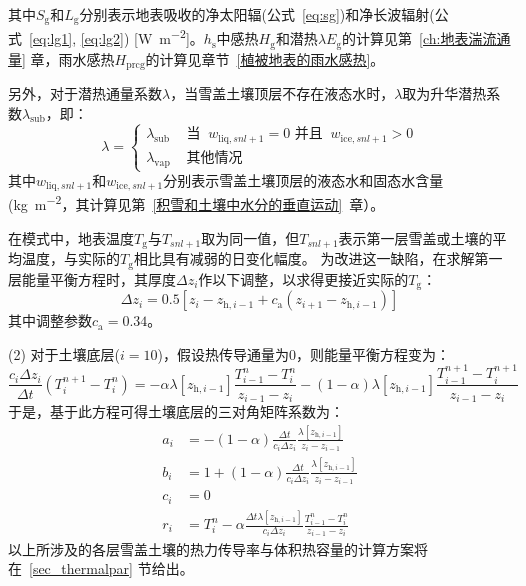 其中$S_{\mathrm {g}} $和$L_{\mathrm {g}} $分别表示地表吸收的净太阳辐(公式~\eqref{eq:sg})和净长波辐射(公式~\eqref{eq:lg1}, \eqref{eq:lg2}) [\unit{W.m^{-2}}]。$h_{\mathrm {s}} $中感热$H_{\mathrm{g}}$和潜热$\lambda E_{\mathrm {g}} $的计算见第~\ref{ch:地表湍流通量} 章，雨水感热$H_{\mathrm{prcg}}$的计算见章节~\ref{植被地表的雨水感热}。

另外，对于潜热通量系数$\lambda$，当雪盖土壤顶层不存在液态水时，$\lambda$取为升华潜热系数$\lambda_{\mathrm {sub}} $，即：
\begin{equation}
  \lambda=\left\{\begin{array}{lr}\lambda_{\mathrm{sub}} & \text { 当 }\ w_{\mathrm{liq},snl+1}=0 \text { 并且 }\ w_{\mathrm{ice},snl+1}>0 \\ \lambda_{\mathrm{vap}} & \text { 其他情况 }\end{array}\right.
\end{equation}
其中$w_{\mathrm{liq},snl+1}$和$w_{\mathrm{ice},snl+1}$分别表示雪盖土壤顶层的液态水和固态水含量 (\unit{kg.m^{-2}}，其计算见第~\ref{积雪和土壤中水分的垂直运动}~章）。

在模式中，地表温度$T_{\mathrm {g}} $与$T_{snl+1}$取为同一值，但$T_{snl+1}$表示第一层雪盖或土壤的平均温度，与实际的$T_{\mathrm {g}} $相比具有减弱的日变化幅度。 为改进这一缺陷，在求解第一层能量平衡方程时，其厚度$\Delta z_{i} $作以下调整，以求得更接近实际的$T_{\mathrm {g}}$：
\begin{equation}
\Delta z_{i}=0.5\left[z_{i}-z_{\mathrm{h},i-1}+c_{\mathrm{a}}\left(z_{i+1}-z_{\mathrm{h},i-1}\right)\right]
\end{equation}
其中调整参数$c_{\mathrm {a}} =0.34$。

(2) 对于土壤底层($i=10$)，假设热传导通量为0，则能量平衡方程变为：
\begin{equation}
  \frac{c_{i} \Delta z_{i}}{\Delta t}\left(T_{i}^{n+1}-T_{i}^{n}\right)=-\alpha \lambda\left[z_{\mathrm{h},i-1}\right] \frac{T_{i-1}^{n}-T_{i}^{n}}{z_{i-1}-z_{i}}-(1-\alpha) \lambda\left[z_{\mathrm{h},i-1}\right] \frac{T_{i-1}^{n+1}-T_{i}^{n+1}}{z_{i-1}-z_{i}}
\end{equation}
于是，基于此方程可得土壤底层的三对角矩阵系数为：
\begin{equation}
  \begin{aligned}
    a_{i} &= -(1-\alpha) \frac{\Delta t}{c_{i} \Delta z_{i}} \frac{\lambda\left[z_{\mathrm{h},i-1}\right]}{z_{i}-z_{i-1}} \\
    b_{i} &= 1+(1-\alpha) \frac{\Delta t}{c_{i} \Delta z_{i}} \frac{\lambda\left[z_{\mathrm{h},i-1}\right]}{z_{i}-z_{i-1}} \\
    c_{i} &= 0 \\
    r_{i} &= T_{i}^{n}-\alpha \frac{\Delta t \lambda\left[z_{\mathrm{h},i-1}\right]}{c_{i} \Delta z_{i}} \frac{T_{i-1}^{n}-T_{i}^{n}}{z_{i-1}-z_{i}}
  \end{aligned}
\end{equation}
%
以上所涉及的各层雪盖土壤的热力传导率与体积热容量的计算方案将在~\ref{sec_thermalpar} 节给出。


